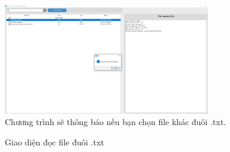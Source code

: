 \begin{itemize}
\begin{figure}[H]
        \centering
        \includegraphics[width=0.8\textwidth]{images/img6.png} 
        \caption{Chương trình sẽ thông báo nếu bạn chọn file khác đuôi .txt.}
        \label{figure:s1}
\end{figure}

        \begin{figure}[H]
    \centering
    \qquad
    \caption{Giao diện đọc file đuôi .txt}
    \label{fig:stackArrayPush}%
\end{figure}


\end{itemize}
